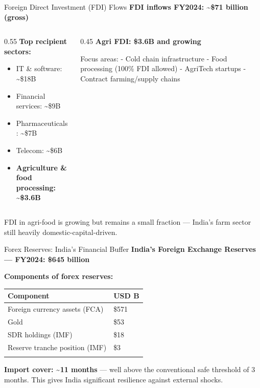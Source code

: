 \documentclass[
  ignorenonframetext,
  aspectratio=169,
]{beamer}
\makeatletter
\providecommand{\tightlist}{%
  \setlength{\itemsep}{0pt}\setlength{\parskip}{0pt}}
\let\quarto@originallabel\label
\DeclareRobustCommand*{\label}[1]{\quarto@originallabel{#1}}
\makeatother
\begin{document}
\begin{frame}{Foreign Direct Investment (FDI) Flows}
\label{foreign-direct-investment-fdi-flows}
\textbf{FDI inflows FY2024: \textasciitilde\$71 billion (gross)}

\begin{columns}[T]
\begin{column}{0.55\linewidth}
\textbf{Top recipient sectors:}

\begin{itemize}
\tightlist
\item
  IT \& software: \textasciitilde\$18B
\item
  Financial services: \textasciitilde\$9B
\item
  Pharmaceuticals: \textasciitilde\$7B
\item
  Telecom: \textasciitilde\$6B
\item
  \textbf{Agriculture \& food processing: \textasciitilde\$3.6B}
\end{itemize}
\end{column}

\begin{column}{0.45\linewidth}
\textbf{Agri FDI: \$3.6B and growing}

Focus areas: - Cold chain infrastructure - Food processing (100\% FDI
allowed) - AgriTech startups - Contract farming/supply chains
\end{column}
\end{columns}

FDI in agri-food is growing but remains a small fraction --- India's
farm sector still heavily domestic-capital-driven.
\end{frame}

\begin{frame}{Forex Reserves: India's Financial Buffer}
\label{forex-reserves-indias-financial-buffer}
\textbf{India's Foreign Exchange Reserves --- FY2024: \$645 billion}

\textbf{Components of forex reserves:}

\begin{longtable}[]{@{}ll@{}}
\toprule\noalign{}
Component & USD B \\
\midrule\noalign{}
\endhead
Foreign currency assets (FCA) & \$571 \\
Gold & \$53 \\
SDR holdings (IMF) & \$18 \\
Reserve tranche position (IMF) & \$3 \\
\bottomrule\noalign{}
\end{longtable}

\textbf{Import cover: \textasciitilde11 months} --- well above the
conventional safe threshold of 3 months. This gives India significant
resilience against external shocks.
\end{frame}
\end{document}
